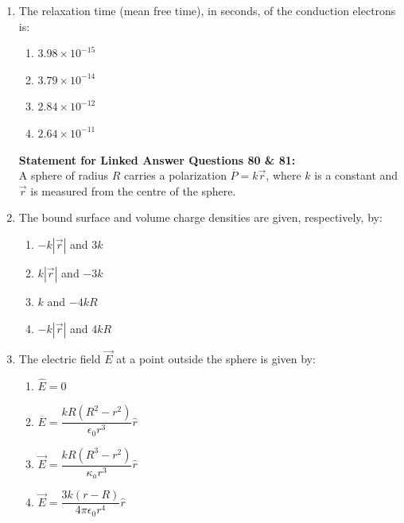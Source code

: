 \documentclass[journal,12pt,onecolumn]{IEEEtran}
\begin{document}
\begin{enumerate}[itemsep = 1em]
\item The relaxation time (mean free time), in seconds, of the conduction electrons is:

\hfill{}

\begin{multicols}{4}
\begin{enumerate}
    \item $3.98 \times 10^{-15}$
    \item $3.79 \times 10^{-14}$
    \item $2.84 \times 10^{-12}$
    \item $2.64 \times 10^{-11}$
\end{enumerate}
\end{multicols}

\vspace{2em}

\textbf{Statement for Linked Answer Questions 80 \& 81:} \\
A sphere of radius $R$ carries a polarization $\overline{P} = k \vec{r}$, where $k$ is a constant and $\vec{r}$ is measured from the centre of the sphere.

\item The bound surface and volume charge densities are given, respectively, by:

\hfill{}

\begin{multicols}{4}
\begin{enumerate}
    \item $-k |\vec{r}|$ and $3k$
    \item $k |\vec{r}|$ and $-3k$
    \item $k$ and $-4kR$
    \item $-k |\vec{r}|$ and $4kR$
\end{enumerate}
\end{multicols}

\item The electric field $\vec{E}$ at a point outside the sphere is given by:

\hfill{}

\begin{multicols}{4}
\begin{enumerate}
    \item $\hat{E} = 0$
    \item $\overline{E} = \dfrac{k R (R^2 - r^2)}{\epsilon_0 r^3} \hat{r}$
    \item $\vec{E} = \dfrac{k R (R^3 - r^2)}{\kappa_a r^3} \hat{r}$
    \item $\vec{E} = \dfrac{3k (r - R)}{4 \pi \epsilon_0 r^4} \hat{r}$
\end{enumerate}
\end{multicols}


\end{enumerate}
\end{document}
